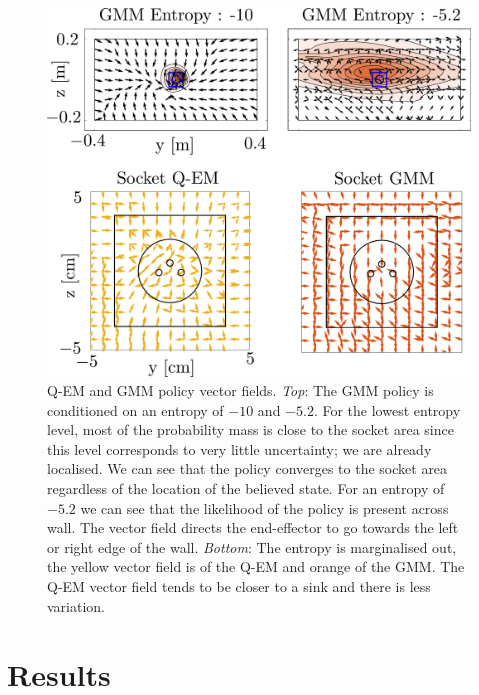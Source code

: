 \begin{figure}
   \includegraphics[width=\textwidth]{./ch4-PiH/Figures/Fig/policy_vf.pdf}
  \caption{Q-EM and GMM policy vector fields. \textit{Top}: The GMM policy is conditioned on an entropy of $-10$ and $-5.2$. For the lowest entropy level,
  most of the probability mass is close to the socket area since this level corresponds to very little uncertainty; we are already localised. We can see 
  that the policy converges to the socket area regardless of the location of the believed state. For an entropy of $-5.2$ we can see that 
  the likelihood of the policy is present across wall. The vector field directs the end-effector to go towards the left or right edge of the wall. 
  \textit{Bottom}: The entropy is marginalised out, the yellow vector field is of the Q-EM and orange of the GMM. The Q-EM vector field tends 
  to be closer to a sink and there is less variation.}
  \label{fig:policy_vf}
\end{figure}

\FloatBarrier
\section{Results}\label{ch4:results}

